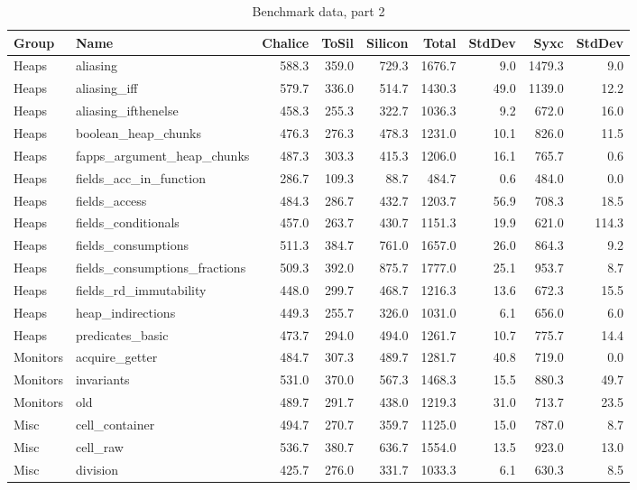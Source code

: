 \begin{sidewaystable}
\caption{Benchmark data, part 2}\label{tbl:benchmark-data-2}
\begin{tabular}{l l || r r r | r r | r r}
Group & Name & Chalice & ToSil & Silicon & Total & StdDev & Syxc & StdDev\\ \hline
Heaps & aliasing & 588.3 & 359.0 & 729.3 & 1676.7 & 9.0 & 1479.3 & 9.0\\ 
Heaps & aliasing_iff & 579.7 & 336.0 & 514.7 & 1430.3 & 49.0 & 1139.0 & 12.2\\ 
Heaps & aliasing_ifthenelse & 458.3 & 255.3 & 322.7 & 1036.3 & 9.2 & 672.0 & 16.0\\ 
Heaps & boolean_heap_chunks & 476.3 & 276.3 & 478.3 & 1231.0 & 10.1 & 826.0 & 11.5\\ 
Heaps & fapps_argument_heap_chunks & 487.3 & 303.3 & 415.3 & 1206.0 & 16.1 & 765.7 & 0.6\\ 
Heaps & fields_acc_in_function & 286.7 & 109.3 & 88.7 & 484.7 & 0.6 & 484.0 & 0.0\\ 
Heaps & fields_access & 484.3 & 286.7 & 432.7 & 1203.7 & 56.9 & 708.3 & 18.5\\ 
Heaps & fields_conditionals & 457.0 & 263.7 & 430.7 & 1151.3 & 19.9 & 621.0 & 114.3\\ 
Heaps & fields_consumptions & 511.3 & 384.7 & 761.0 & 1657.0 & 26.0 & 864.3 & 9.2\\ 
Heaps & fields_consumptions_fractions & 509.3 & 392.0 & 875.7 & 1777.0 & 25.1 & 953.7 & 8.7\\ 
Heaps & fields_rd_immutability & 448.0 & 299.7 & 468.7 & 1216.3 & 13.6 & 672.3 & 15.5\\ 
Heaps & heap_indirections & 449.3 & 255.7 & 326.0 & 1031.0 & 6.1 & 656.0 & 6.0\\ 
Heaps & predicates_basic & 473.7 & 294.0 & 494.0 & 1261.7 & 10.7 & 775.7 & 14.4\\ 
Monitors & acquire_getter & 484.7 & 307.3 & 489.7 & 1281.7 & 40.8 & 719.0 & 0.0\\ 
Monitors & invariants & 531.0 & 370.0 & 567.3 & 1468.3 & 15.5 & 880.3 & 49.7\\ 
Monitors & old & 489.7 & 291.7 & 438.0 & 1219.3 & 31.0 & 713.7 & 23.5\\ 
Misc & cell_container & 494.7 & 270.7 & 359.7 & 1125.0 & 15.0 & 787.0 & 8.7\\ 
Misc & cell_raw & 536.7 & 380.7 & 636.7 & 1554.0 & 13.5 & 923.0 & 13.0\\ 
Misc & division & 425.7 & 276.0 & 331.7 & 1033.3 & 6.1 & 630.3 & 8.5\\ 

\end{tabular}
\end{sidewaystable}
